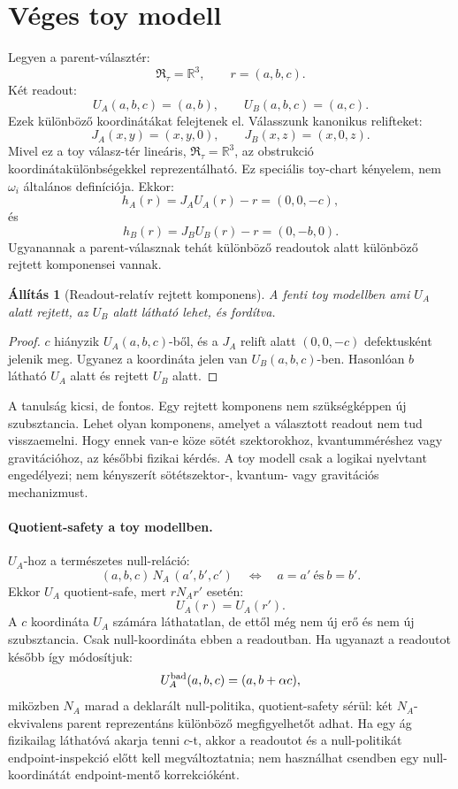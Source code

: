 \documentclass[12pt]{article}
\newtheorem{proposition}{Állítás}
\newcommand{\RTspace}{\mathfrak R_{\tau}}
\begin{document}
\section{Véges toy modell}

Legyen a parent-választér:
\[
  \RTspace=\mathbb R^3,\qquad r=(a,b,c).
\]
Két readout:
\[
  U_A(a,b,c)=(a,b),\qquad U_B(a,b,c)=(a,c).
\]
Ezek különböző koordinátákat felejtenek el.  Válasszunk kanonikus relifteket:
\[
  J_A(x,y)=(x,y,0),\qquad J_B(x,z)=(x,0,z).
\]
Mivel ez a toy válasz-tér lineáris, \(\RTspace=\mathbb R^3\), az obstrukció
koordinátakülönbségekkel reprezentálható.  Ez speciális toy-chart kényelem,
nem \(\omega_i\) általános definíciója.
Ekkor:
\[
  h_A(r)=J_AU_A(r)-r=(0,0,-c),
\]
és
\[
  h_B(r)=J_BU_B(r)-r=(0,-b,0).
\]
Ugyanannak a parent-válasznak tehát különböző readoutok alatt különböző rejtett
komponensei vannak.

\begin{proposition}[Readout-relatív rejtett komponens]
A fenti toy modellben ami \(U_A\) alatt rejtett, az \(U_B\) alatt látható
lehet, és fordítva.
\end{proposition}

\begin{proof}
\(c\) hiányzik \(U_A(a,b,c)\)-ből, és a \(J_A\) relift alatt
\((0,0,-c)\) defektusként jelenik meg.  Ugyanez a koordináta jelen van
\(U_B(a,b,c)\)-ben.  Hasonlóan \(b\) látható \(U_A\) alatt és rejtett \(U_B\)
alatt.
\end{proof}

A tanulság kicsi, de fontos.  Egy rejtett komponens nem szükségképpen új
szubsztancia.  Lehet olyan komponens, amelyet a választott readout nem tud
visszaemelni.  Hogy ennek van-e köze sötét szektorokhoz, kvantumméréshez vagy
gravitációhoz, az későbbi fizikai kérdés.  A toy modell csak a logikai
nyelvtant engedélyezi; nem kényszerít sötétszektor-, kvantum- vagy
gravitációs mechanizmust.

\paragraph{Quotient-safety a toy modellben.}
\(U_A\)-hoz a természetes null-reláció:
\[
  (a,b,c)\,N_A\,(a',b',c')
  \quad\Longleftrightarrow\quad
  a=a'\ \text{és}\ b=b'.
\]
Ekkor \(U_A\) quotient-safe, mert \(rN_A r'\) esetén:
\[
  U_A(r)=U_A(r').
\]
A \(c\) koordináta \(U_A\) számára láthatatlan, de ettől még nem új erő és
nem új szubsztancia.  Csak null-koordináta ebben a readoutban.  Ha ugyanazt a
readoutot később így módosítjuk:
\[
  U_A^{\rm bad}(a,b,c)=(a,b+\alpha c),
\]
miközben \(N_A\) marad a deklarált null-politika, quotient-safety sérül:
két \(N_A\)-ekvivalens parent reprezentáns különböző megfigyelhetőt adhat.
Ha egy ág fizikailag láthatóvá akarja tenni \(c\)-t, akkor a readoutot és a
null-politikát endpoint-inspekció előtt kell megváltoztatnia; nem használhat
csendben egy null-koordinátát endpoint-mentő korrekcióként.
\end{document}

